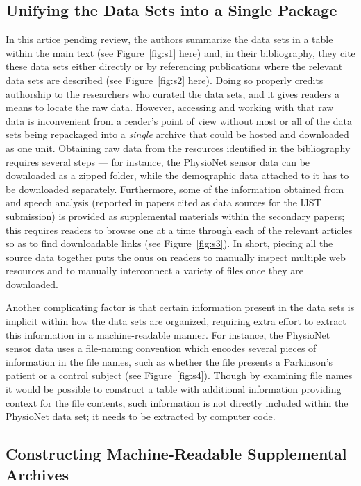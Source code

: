 \documentclass[11pt,letterpaper]{article}
\newcommand{\MRI}{\resizebox{!}{7pt}{\AcronymText{MRI}}}
\newcommand{\textscc}[1]{{\color{orr!35!black}{{%
						\fontfamily{Cabin-TLF}\fontseries{b}\selectfont{\textsc{\scriptsize{#1}}}}}}}
\newcommand{\AcronymText}[1]{{\textscc{#1}}}
\newcommand{\p}[1]{

\vspace{.7em}#1}
\begin{document}
{\subsection{Unifying the Data Sets into a Single Package}  
\p{In this artice pending review, the authors summarize the data sets 
in a table within the main text 
(see Figure~\ref{fig:s1} here) and, in their bibliography, they 
cite these data sets either directly or by 
referencing publications where the relevant data sets are described 
(see Figure~\ref{fig:s2} here).  Doing so properly 
credits authorship to the researchers who curated the data sets, and it gives readers a 
means to locate the raw data.  However, accessing and working with that raw data is 
inconvenient from a reader's point of view without most or all of the data sets being 
repackaged into a \textit{single} archive that could be hosted and downloaded as one unit.  
Obtaining raw data from the resources identified in the bibliography requires 
several steps --- for instance, the PhysioNet sensor data can be downloaded 
as a zipped folder, while the demographic data attached to it has to be downloaded 
separately.  Furthermore, some of the information obtained from \MRI{} and speech analysis 
(reported in papers cited as data sources for the IJST submission) is provided 
as supplemental materials within the secondary papers; this requires readers 
to browse one at a time through each of the relevant articles so as to find 
downloadable links (see Figure~\ref{fig:s3}).  In short, piecing all 
the source data together puts the onus on readers to manually inspect multiple 
web resources and to manually interconnect a variety of files once they are downloaded.}

\p{Another complicating factor is that certain information present in the data sets 
is implicit within how the data sets are organized, requiring extra effort to 
extract this information in a machine-readable manner.  For instance, the PhysioNet 
sensor data uses a file-naming convention which encodes several pieces of 
information in the file names, such as whether the file presents a Parkinson's patient 
or a control subject (see Figure~\ref{fig:s4}).  
Though by examining file names it would be possible to construct a 
table with additional information providing context for the file contents, 
such information is not directly included within the PhysioNet data set; it 
needs to be extracted by computer code.}


\subsection{Constructing Machine-Readable Supplemental Archives}

}
\end{document}
